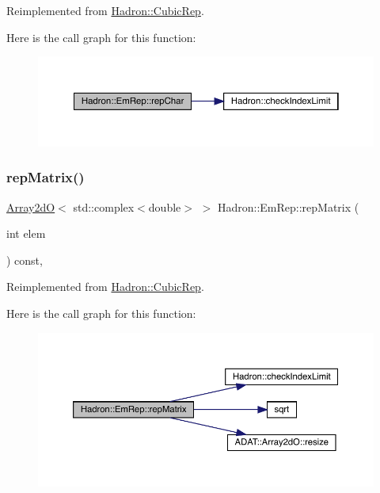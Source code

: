 Reimplemented from \mbox{\hyperlink{structHadron_1_1CubicRep_af45227106e8e715e84b0af69cd3b36f8}{Hadron\+::\+Cubic\+Rep}}.

Here is the call graph for this function\+:
\nopagebreak
\begin{figure}[H]
\begin{center}
\leavevmode
\includegraphics[width=350pt]{d6/d4b/structHadron_1_1EmRep_ab57e91b1997f75e0eff8a03bac6f34db_cgraph}
\end{center}
\end{figure}
\mbox{\label{structHadron_1_1EmRep_a8c91198aaf2473fd63a22c16ed7415f2}} 
\subsubsection{\texorpdfstring{repMatrix()}{repMatrix()}\hspace{0.1cm}{\footnotesize\ttfamily [1/2]}}
{\footnotesize\ttfamily \mbox{\hyperlink{classADAT_1_1Array2dO}{Array2dO}}$<$ std\+::complex$<$double$>$ $>$ Hadron\+::\+Em\+Rep\+::rep\+Matrix (\begin{DoxyParamCaption}\item[{int}]{elem }\end{DoxyParamCaption}) const\hspace{0.3cm}{\ttfamily [inline]}, {\ttfamily [virtual]}}



Reimplemented from \mbox{\hyperlink{structHadron_1_1CubicRep_ac5d7e9e6f4ab1158b5fce3e4ad9e8005}{Hadron\+::\+Cubic\+Rep}}.

Here is the call graph for this function\+:
\nopagebreak
\begin{figure}[H]
\begin{center}
\leavevmode
\includegraphics[width=350pt]{d6/d4b/structHadron_1_1EmRep_a8c91198aaf2473fd63a22c16ed7415f2_cgraph}
\end{center}
\end{figure}
\mbox{\label{structHadron_1_1EmRep_a8c91198aaf2473fd63a22c16ed7415f2}} 
